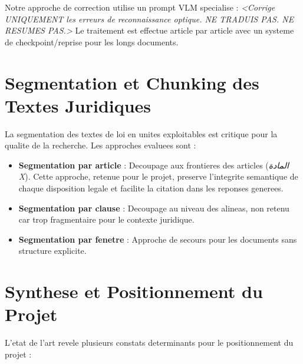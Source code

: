 Notre approche de correction utilise un prompt VLM specialise : \textit{<Corrige UNIQUEMENT les erreurs de reconnaissance optique. NE TRADUIS PAS. NE RESUMES PAS.>} Le traitement est effectue article par article avec un systeme de checkpoint/reprise pour les longs documents.

\section{Segmentation et Chunking des Textes Juridiques}

La segmentation des textes de loi en unites exploitables est critique pour la qualite de la recherche. Les approches evaluees sont :

\begin{itemize}
    \item \textbf{Segmentation par article} : Decoupage aux frontieres des articles (\textit{المادة X}). Cette approche, retenue pour le projet, preserve l'integrite semantique de chaque disposition legale et facilite la citation dans les reponses generees.
    \item \textbf{Segmentation par clause} : Decoupage au niveau des alineas, non retenu car trop fragmentaire pour le contexte juridique.
    \item \textbf{Segmentation par fenetre} : Approche de secours pour les documents sans structure explicite.
\end{itemize}

\section{Synthese et Positionnement du Projet}

L'etat de l'art revele plusieurs constats determinants pour le positionnement du projet :

